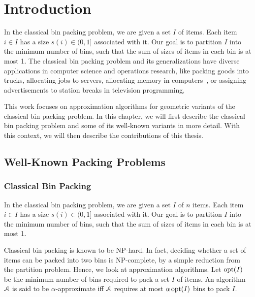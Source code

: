 \chapter{Introduction}
\label{chap:intro}

In the classical bin packing problem, we are given a set $I$ of items.
Each item $i \in I$ has a size $s(i) \in (0, 1]$ associated with it.
Our goal is to partition $I$ into the minimum number of bins,
such that the sum of sizes of items in each bin is at most 1.
The classical bin packing problem and its generalizations
have diverse applications in computer science and operations research,
like packing goods into trucks, allocating jobs to servers,
allocating memory in computers~\cite{handbook-of-combinopt-bp},
or assigning advertisements to station breaks in television programming,

This work focuses on approximation algorithms for geometric variants
of the classical bin packing problem.
In this chapter, we will first describe the classical bin packing problem
and some of its well-known variants in more detail.
With this context, we will then describe the contributions of this thesis.

\section{Well-Known Packing Problems}

\subsection{Classical Bin Packing}

In the classical bin packing problem, we are given a set $I$ of $n$ items.
Each item $i \in I$ has a size $s(i) \in (0, 1]$ associated with it.
Our goal is to partition $I$ into the minimum number of bins,
such that the sum of sizes of items in each bin is at most 1.

Classical bin packing is known to be NP-hard.
In fact, deciding whether a set of items can be packed into two bins is NP-complete,
by a simple reduction from the partition problem.
Hence, we look at approximation algorithms.
Let $\operatorname{opt}(I)$ be the minimum number of bins required to pack a set $I$ of items.
An algorithm $\mathcal{A}$ is said to be $\alpha$-approximate iff
$\mathcal{A}$ requires at most $\alpha\operatorname{opt}(I)$ bins to pack $I$.

